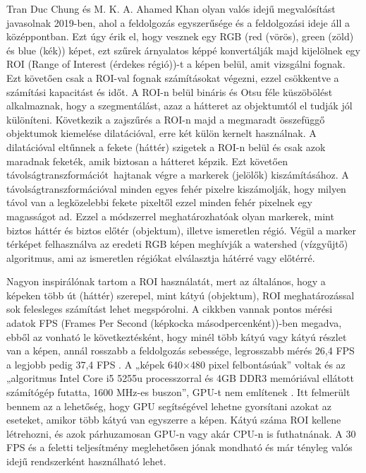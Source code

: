 Tran Duc Chung és M. K. A. Ahamed Khan olyan valós idejű megvalósítást
javasolnak 2019-ben, ahol a feldolgozás egyszerűsége és a feldolgozási
ideje áll a középpontban. Ezt úgy érik el, hogy vesznek egy RGB (red
(vörös), green (zöld) és blue (kék)) képet, ezt szűrek árnyalatos képpé
konvertálják majd kijelölnek egy ROI (Range of Interest (érdekes
régió))-t a képen belül, amit vizsgálni fognak. Ezt követően csak a
ROI-val fognak számításokat végezni, ezzel csökkentve a számítási
kapacitást és időt. A ROI-n belül bináris és Otsu féle küszöbölést
alkalmaznak, hogy a szegmentálást, azaz a hátteret az objektumtól el
tudják jól különíteni. Következik a zajszűrés a ROI-n majd a megmaradt
összefüggő objektumok kiemelése dilatációval, erre két külön kernelt
használnak. A dilatációval eltűnnek a fekete (háttér) szigetek a ROI-n
belül és csak azok maradnak feketék, amik biztosan a hátteret képzik.
Ezt követően távolságtranszformációt~hajtanak végre a markerek (jelölők)
kiszámításához. A távolságtranszformációval minden egyes fehér pixelre
kiszámolják, hogy milyen távol van a legközelebbi fekete pixeltől ezzel
minden fehér pixelnek egy magasságot ad. Ezzel a módszerrel
meghatározhatóak olyan markerek, mint biztos háttér és biztos előtér
(objektum), illetve ismeretlen régió. Végül a marker térképet
felhasználva az eredeti RGB képen meghívják a watershed (vízgyűjtő)
algoritmus, ami az ismeretlen régiókat elválasztja hátérré vagy
előtérré. \cite{chungWatershedbasedRealtimeImage2019}

Nagyon inspirálónak tartom a ROI használatát, mert az általános, hogy a
képeken több út (háttér) szerepel, mint kátyú (objektum), ROI
meghatározással sok felesleges számítást lehet megspórolni. A cikkben
vannak pontos mérési adatok FPS (Frames Per Second (képkocka
másodpercenként))-ben megadva, ebből az vonható le következtésként, hogy
minél több kátyú vagy kátyú részlet van a képen, annál rosszabb a
feldolgozás sebessége, legrosszabb mérés 26,4 FPS a legjobb pedig 37,4
FPS \cite{safyariReviewVisionBasedPothole2024}. A „képek 640×480 pixel felbontásúak'' voltak és az
„algoritmus Intel Core i5 5255u processzorral és 4GB DDR3 memóriával
ellátott számítógép futatta, 1600 MHz-es buszon'', GPU-t nem
említenek \cite{chungWatershedbasedRealtimeImage2019}. Itt felmerült bennem az a lehetőség, hogy GPU
segítségével lehetne gyorsítani azokat az eseteket, amikor több kátyú
van egyszerre a képen. Kátyú száma ROI kellene létrehozni, és azok
párhuzamosan GPU-n vagy akár CPU-n is futhatnának. A 30 FPS és a feletti
teljesítmény meglehetősen jónak mondható és már tényleg valós idejű
rendszerként használható lehet.

